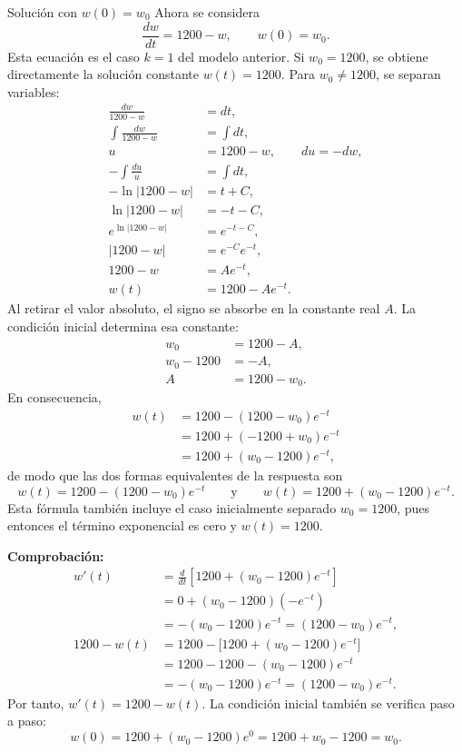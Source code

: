 \begin{examplebox}{Solución con $w(0)=w_0$}
Ahora se considera
\[
 \frac{dw}{dt}=1200-w,
 \qquad w(0)=w_0.
\]
Esta ecuación es el caso $k=1$ del modelo anterior. Si $w_0=1200$, se obtiene directamente la solución constante $w(t)=1200$. Para $w_0\neq1200$, se separan variables:
\begin{align*}
 \frac{dw}{1200-w}&=dt,\\
 \int\frac{dw}{1200-w}&=\int dt,\\
 u&=1200-w,\qquad du=-dw,\\
 -\int\frac{du}{u}&=\int dt,\\
 -\ln|1200-w|&=t+C,\\
 \ln|1200-w|&=-t-C,\\
 e^{\ln|1200-w|}&=e^{-t-C},\\
 |1200-w|&=e^{-C}e^{-t},\\
 1200-w&=Ae^{-t},\\
 w(t)&=1200-Ae^{-t}.
\end{align*}
Al retirar el valor absoluto, el signo se absorbe en la constante real $A$. La condición inicial determina esa constante:
\begin{align*}
 w_0&=1200-A,\\
 w_0-1200&=-A,\\
 A&=1200-w_0.
\end{align*}
En consecuencia,
\begin{align*}
 w(t)&=1200-(1200-w_0)e^{-t}\\
 &=1200+(-1200+w_0)e^{-t}\\
 &=1200+(w_0-1200)e^{-t},
\end{align*}
de modo que las dos formas equivalentes de la respuesta son
\[
 \boxed{w(t)=1200-(1200-w_0)e^{-t}}
 \qquad\text{y}\qquad
 \boxed{w(t)=1200+(w_0-1200)e^{-t}}.
\]
Esta fórmula también incluye el caso inicialmente separado $w_0=1200$, pues entonces el término exponencial es cero y $w(t)=1200$.

\textbf{Comprobación:}
\begin{align*}
 w'(t)&=\frac{d}{dt}\left[1200+(w_0-1200)e^{-t}\right]\\
 &=0+(w_0-1200)(-e^{-t})\\
 &=-(w_0-1200)e^{-t}=(1200-w_0)e^{-t},\\
 1200-w(t)&=1200-\bigl[1200+(w_0-1200)e^{-t}\bigr]\\
 &=1200-1200-(w_0-1200)e^{-t}\\
 &=-(w_0-1200)e^{-t}=(1200-w_0)e^{-t}.
\end{align*}
Por tanto, $w'(t)=1200-w(t)$. La condición inicial también se verifica paso a paso:
\[
 w(0)=1200+(w_0-1200)e^0=1200+w_0-1200=w_0.
\]
\end{examplebox}

